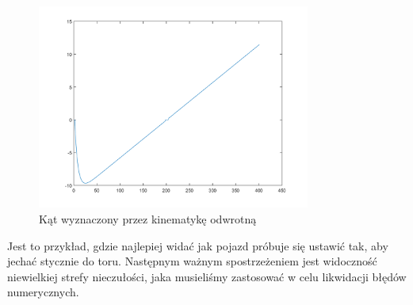 \documentclass[a4paper, 12pt]{report}
\begin{document}
				\begin{figure}[H]
					\centering
					\includegraphics[width = 0.8\textwidth]{./AP/img/line_in_3.png}
					\caption{Kąt wyznaczony przez kinematykę odwrotną}
				\end{figure}
				Jest to przykład, gdzie najlepiej widać jak pojazd próbuje się ustawić tak, aby jechać stycznie do toru. Następnym ważnym spostrzeżeniem jest widoczność niewielkiej strefy nieczułości, jaka musieliśmy zastosować w celu likwidacji błędów numerycznych.
			\newpage
\end{document}
